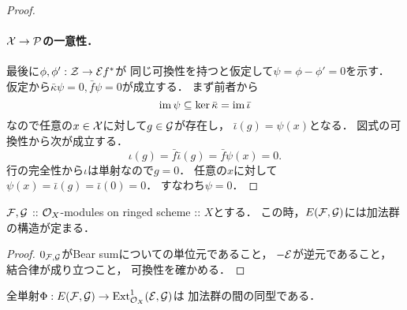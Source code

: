 \documentclass[a4paper]{jsarticle}
\begin{document}
\begin{proof}
        \paragraph{$\mathcal{X} \to \mathcal{P}$の一意性．}
        最後に$\phi, \phi': \mathcal{Z} \to \mathcal{E} f^*$が
        同じ可換性を持つと仮定して$\psi=\phi-\phi'=0$を示す．
        仮定から$\bar{\kappa} \psi=0, \bar{f}\psi=0$が成立する．
        まず前者から
        \[ \operatorname{im} \psi \subseteq \ker \bar{\kappa}=\operatorname{im} \bar{\iota} \]
        なので任意の$x \in \mathcal{X}$に対して$g \in \mathcal{G}$が存在し，
        $\bar{\iota}(g)=\psi(x)$となる．
        図式の可換性から次が成立する．
        \[ \iota(g)=\bar{f}\bar{\iota}(g)=\bar{f}\psi(x)=0. \]
        行の完全性から$\iota$は単射なので$g=0$．
        任意の$x$に対して$\psi(x)=\bar{\iota}(g)=\bar{\iota}(0)=0$．
        すなわち$\psi=0$．
    \end{proof}

    \begin{Lemma}
        $\mathcal{F}, \mathcal{G}$ :: $\mathcal{O}_X$-modules on ringed scheme :: $X$とする．
        この時，$E(\mathcal{F}, \mathcal{G})$には加法群の構造が定まる．
    \end{Lemma}
    \begin{proof}
        $0_{\mathcal{F}, \mathcal{G}}$がBear sumについての単位元であること，
        $-\mathcal{E}$が逆元であること，
        結合律が成り立つこと，
        可換性を確かめる．
    \end{proof}

    \begin{Lemma}\label{lemma:PhiIsIso}
        全単射$\Phi: E(\mathcal{F}, \mathcal{G}) \to \operatorname{Ext}^1_{\mathcal{O}_X}(\mathcal{E}, \mathcal{G})$は
        加法群の間の同型である．
    \end{Lemma}
\end{document}
